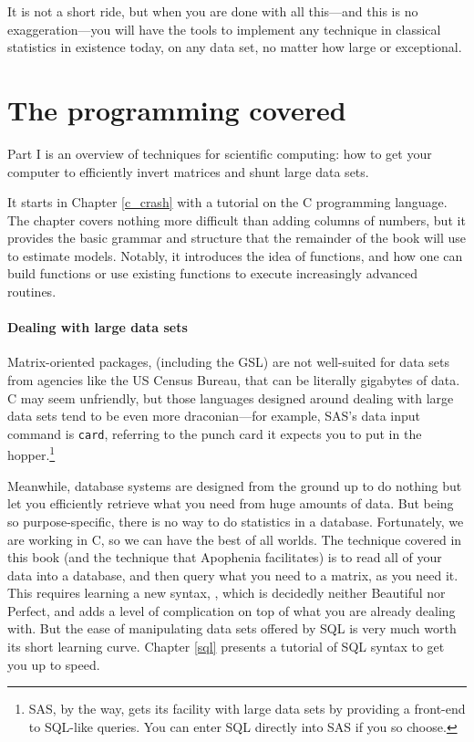 It is not a short ride, but when you are done with all this---and this
is no exaggeration---you will have the tools to implement any technique
in classical statistics in existence today, on any data set, no matter
how large or exceptional.

\section{The programming covered}

Part I is an overview of techniques for scientific computing: how to get
your computer to efficiently invert matrices and shunt large data sets.

It starts in Chapter \ref{c_crash} with a tutorial on the C programming
language.  The chapter covers nothing more difficult than adding
columns of numbers, but it provides the basic grammar and structure that
the remainder of the book will use to estimate models. Notably,
it introduces the idea of functions, and how one can build functions or
use existing functions to execute increasingly advanced routines.

\paragraph{Dealing with large data sets} Matrix-oriented packages,
(including the GSL) are not well-suited for data sets from agencies like
the US Census Bureau, that can be literally gigabytes of data.
C may seem unfriendly, but
those languages designed around dealing with large data sets tend
to be even more draconian---for example, SAS's data input command
is {\tt card}, referring to the punch card it expects you to put in the
hopper.\footnote{SAS, by the way, gets its facility with large data sets
by providing a front-end to SQL-like queries. You can enter SQL directly into
SAS if you so choose.}

Meanwhile, database systems are designed from the ground up to do nothing
but let you efficiently retrieve what you need from huge amounts of data.
But being so purpose-specific, there is no way to do statistics in
a database. Fortunately,
we are working in C, so we can have the best of all worlds. The technique
covered in this book (and the technique that Apophenia facilitates)
is to
read all of your data into a database, and then query what you need to a
matrix, as you need it. This requires learning a new syntax, ,
which is decidedly neither Beautiful nor Perfect, and adds a level of
complication on top of what you are already dealing with. But the ease
of manipulating data sets offered by SQL is very much worth its short
learning curve. Chapter \ref{sql} presents a tutorial of SQL syntax to
get you up to speed. 

